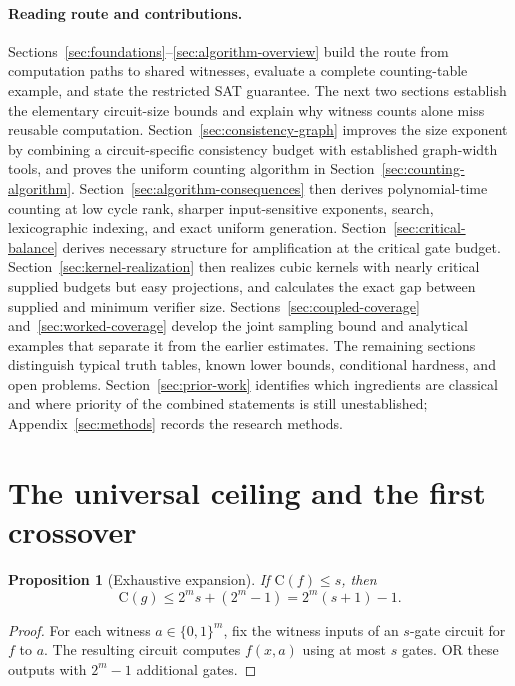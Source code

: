 \documentclass[11pt]{article}
\newtheorem{proposition}[theorem]{Proposition}
\theoremstyle{definition}
\theoremstyle{remark}
\newcommand{\B}{\{0,1\}}
\newcommand{\C}{\mathrm{C}}
\begin{document}
\paragraph{Reading route and contributions.}
Sections~\ref{sec:foundations}--\ref{sec:algorithm-overview}
build the route from computation paths to shared witnesses, evaluate a
complete counting-table example, and state the restricted SAT guarantee.
The next two sections establish the elementary circuit-size bounds and
explain why witness counts alone miss reusable computation.
Section~\ref{sec:consistency-graph} improves the size exponent by combining
a circuit-specific consistency budget with established graph-width tools,
and proves the uniform counting algorithm in
Section~\ref{sec:counting-algorithm}.
Section~\ref{sec:algorithm-consequences} then derives polynomial-time
counting at low cycle rank, sharper input-sensitive exponents, search,
lexicographic indexing, and exact uniform generation.
Section~\ref{sec:critical-balance} derives necessary structure for
amplification at the critical gate budget.
Section~\ref{sec:kernel-realization} then realizes cubic kernels with
nearly critical supplied budgets but easy projections, and calculates
the exact gap between supplied and minimum verifier size.
Sections~\ref{sec:coupled-coverage} and~\ref{sec:worked-coverage}
develop the joint sampling bound and analytical examples that separate
it from the earlier estimates. The remaining sections distinguish
typical truth tables, known lower bounds, conditional hardness, and
open problems. Section~\ref{sec:prior-work} identifies which ingredients
are classical and where priority of the combined statements is still
unestablished; Appendix~\ref{sec:methods} records the research methods.

\section{The universal ceiling and the first crossover}

\begin{proposition}[Exhaustive expansion]\label{prop:enumeration}
If $\C(f)\le s$, then
\[
 \C(g)\le2^m s+(2^m-1)=2^m(s+1)-1.
\]
\end{proposition}
\begin{proof}
For each witness $a\in\B^m$, fix the witness inputs of an $s$-gate
circuit for $f$ to $a$. The resulting circuit computes $f(x,a)$ using
at most $s$ gates. OR these outputs with $2^m-1$ additional gates.
\end{proof}
\end{document}
